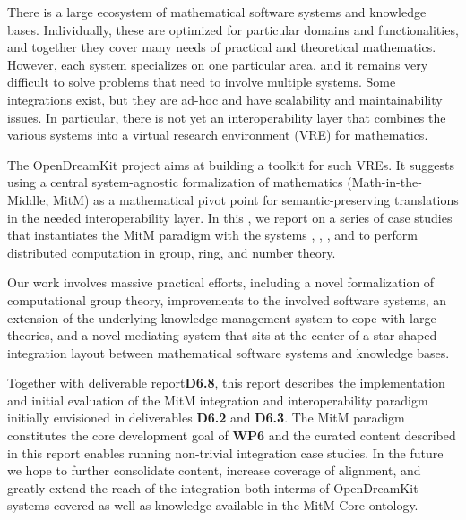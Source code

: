 There is a large ecosystem of mathematical software systems and knowledge bases.
Individually, these are optimized for particular domains and functionalities, and together they cover many needs of practical and theoretical mathematics.
However, each system specializes on one particular area, and it remains very difficult to solve problems that need to involve multiple systems.
Some integrations exist, but they are ad-hoc and have scalability and maintainability issues.
In particular, there is not yet an interoperability layer that combines the various systems into a virtual research environment (VRE) for mathematics.
  
The OpenDreamKit project aims at building a toolkit for such VREs.
It suggests using a central system-agnostic formalization of mathematics (Math-in-the-Middle, MitM) as a mathematical pivot point for semantic-preserving translations in the needed interoperability layer.
In this \papertype, we report on a series of case studies that instantiates the MitM paradigm with the systems \GAP, \Sage, \LMFDB, and \Singular to perform distributed computation in group, ring, and number theory.
 
Our work involves massive practical efforts, including a novel formalization of computational group theory, improvements to the involved software systems, an extension of the underlying knowledge management system to cope with large theories, and a novel mediating system that sits at the center of a star-shaped integration layout between mathematical software systems and knowledge bases.

Together with deliverable report\textbf{D6.8}, this report describes the implementation and initial evaluation of the MitM integration and interoperability paradigm initially envisioned in deliverables \textbf{D6.2} and \textbf{D6.3}.
The MitM paradigm constitutes the core development goal of \textbf{WP6} and the curated content described in this report enables running non-trivial integration case studies.
In the future we hope to further consolidate content, increase coverage of alignment, and greatly extend the reach of the integration both interms of OpenDreamKit systems covered as well as knowledge available in the MitM Core ontology.


